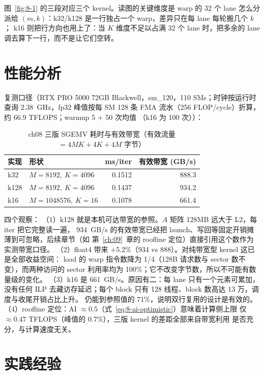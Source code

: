 图~\ref{fig:8-1} 的三段对应三个 kernel。读图的关键维度是 warp 的 32 个 lane
怎么分派给 $(m, k)$：k32/k128 是一行独占一个 warp，差异只在每 lane 每轮搬几个 $k$；
k16 则把行方向也用上了：当 $K$ 维度不足以占满 32 个 lane 时，把多余的 lane
调去算下一行，而不是让它们空转。

\section{性能分析}

复测口径（RTX PRO 5000 72GB Blackwell，sm\_120，110 SMs；时钟按运行时查询
2.38~GHz，fp32 峰值按每 SM 128 条 FMA 流水（256 FLOP/cycle）折算，
约 $66.9$ TFLOPS；warmup 5 + 50 次均值
（k16 为 100 次））：

\begin{table}[htbp]
\centering
\caption{ch08 三版 SGEMV 耗时与有效带宽（有效流量 $= 4MK + 4K + 4M$ 字节）}
\label{tab:8-bench}
\begin{tabular}{llrr}
\toprule
实现 & 形状 & ms/iter & 有效带宽 (GB/s) \\
\midrule
k32  & $M{=}8192,\ K{=}4096$   & 0.1512 & 888.3 \\
k128 & $M{=}8192,\ K{=}4096$   & 0.1437 & 934.2 \\
k16  & $M{=}1048576,\ K{=}16$  & 0.1078 & 661.4 \\
\bottomrule
\end{tabular}
\end{table}

四个观察：
（1）k128 就是本机可达带宽的参照。$A$ 矩阵 128MB 远大于 L2，每 iter 把它完整读一遍，
934~GB/s 的有效带宽已经把 launch、写回等固定开销摊薄到可忽略，后续章节（如
第~\ref{ch:09}~章的 roofline 定位）直接引用这个数作为实测带宽口径。
（2）float4 带来 $+5.2\%$（934 vs 888）。对纯带宽型 kernel 这已是全部收益空间：
load 的 warp 指令数降为 1/4（128B 请求数与 sector 数不变），而两种访问的 sector 利用率均为 100\%；它不改变字节数，所以不可能有数量级的变化。
（3）k16 是 661~GB/s。原因有二：每 lane 只有一个元素可累加，没有任何 ILP
去藏访存延迟；每个 block 只有 128 线程、block 数高达 13 万，调度与收尾开销占比上升。
仍能到参照值的 71\%，说明双行复用的设计是有效的。
（4）roofline 定位：AI $\approx 0.5$（式~\ref{eq:8-ai-optimistic}）意味着计算侧上限
仅 $\approx 0.47$ TFLOPS（峰值的 0.7\%），三版 kernel 的差距全部来自带宽利用
是否充分，与计算速度无关。

\section{实践经验}

